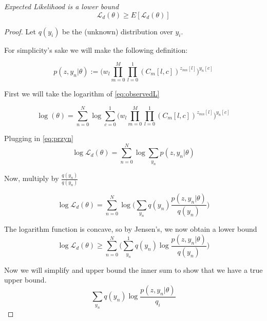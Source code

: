 \newpage
\begin{theorem}
\emph{Expected Likelihood is a lower bound}
\label{EMlower}
$$ \mathcal{L}_{d}(\theta) \geq E[\mathcal{L}_{d}(\theta)]$$
\begin{proof}

Let $q(y_{i})$ be the (unknown) distribution over $y_{i}$.

For simplicity's sake we will make the following definition:

\begin{equation} \label{eq:przyn}
p(z,y_{n}|\theta) :=
\Big (w_{l} \displaystyle\prod\limits_{m=0}^{M} \displaystyle\prod\limits_{l=0}^{1} (C_{m}[l,c])^{z_{mn}[l]} \Big )^{y_{n}[c]}
\end{equation}

First we will take the logarithm of \eqref{eq:observedL}

\begin{equation}
\log (\theta) = \displaystyle\sum\limits_{n=0}^{N} \log
\displaystyle\sum\limits_{c=0}^{1}
\Big (w_{l} \displaystyle\prod\limits_{m=0}^{M} \displaystyle\prod\limits_{l=0}^{1} (C_{m}[l,c])^{z_{mn}[l]} \Big )^{y_{n}[c]}
\end{equation}

Plugging in \eqref{eq:przyn}
\begin{equation} \label{eq:lll}
\log \mathcal{L}_{d}(\theta) = \displaystyle\sum\limits_{n=0}^{N} \log \displaystyle\sum\limits_{y_{n}} p(z,y_{n} | \theta)
\end{equation}

Now, multiply by $\frac{q(y_{n})}{q(y_{n})}$

\begin{equation}
\log \mathcal{L}_{d}(\theta) = \displaystyle\sum\limits_{n=0}^{N} \log \Big ( \displaystyle\sum\limits_{y_{n}} q(y_{n})\frac{p(z,y_{n} | \theta)}{q(y_{n})} \Big )
\end{equation}

The logarithm function is concave, so by Jensen's, we now obtain a lower bound
\begin{equation}\label{eq:jensens}
\log \mathcal{L}_{d}(\theta) \geq
\displaystyle\sum\limits_{n=0}^{N} \Big ( \displaystyle\sum\limits_{y_{n}}^{1} q(y_{n})\log \frac{p(z,y_{n} | \theta)}{q(y_{n})} \Big )
\end{equation}

Now we will simplify and upper bound the inner sum to show that we have a true upper bound.
\begin{equation}
\displaystyle\sum\limits_{y_{n}} q(y_{n}) \log \frac{p(z,y_{n}| \theta)}{q_{i}}
\end{equation}


\end{proof}
\end{theorem}
